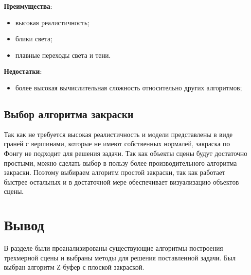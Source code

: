 \textbf{Преимущества}:
\begin{itemize}
    \item высокая реалистичность;
    \item блики света;
    \item плавные переходы света и тени.
\end{itemize}

\textbf{Недостатки}:
\begin{itemize}
    \item более высокая вычислительная сложность относительно других алгоритмов;
\end{itemize}


\subsection{Выбор алгоритма закраски}

Так как не требуется высокая реалистичность и модели представлены в виде граней с вершинами,
которые не имеют собственных нормалей, закраска по Фонгу не подходит для решения задачи.
Так как объекты сцены будут достаточно простыми, можно сделать выбор в пользу более
производительного алгоритма закраски. Поэтому выбираем алгоритм простой закраски, так
как работает быстрее остальных и в достаточной мере обеспечивает визуализацию объектов
сцены.



\section{Вывод}

В разделе были проанализированы существующие алгоритмы построения трехмерной сцены и выбраны
методы для решения поставленной задачи. Был выбран алгоритм Z-буфер с плоской закраской.

